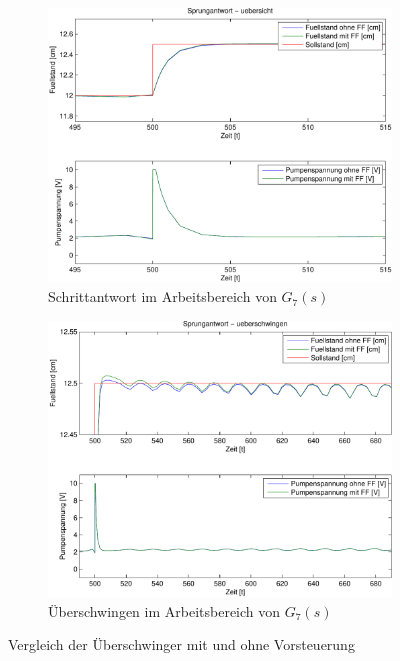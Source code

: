 \begin{figure}[h!]
    \begin{subfigure}{0.475\textwidth}
        \includegraphics[width=1.\textwidth]{13/L7_step_overview_plot.pdf}
        \caption{Schrittantwort im Arbeitsbereich von $G_7(s)$}
    \end{subfigure}
    \hfill{}
    \begin{subfigure}{0.475\textwidth}
        \includegraphics[width=1.\textwidth]{13/L7_step_overshoot_plot.pdf}
        \caption{Überschwingen im Arbeitsbereich von $G_7(s)$}
    \end{subfigure}
    \caption{Vergleich der Überschwinger mit und ohne Vorsteuerung}
\end{figure}

